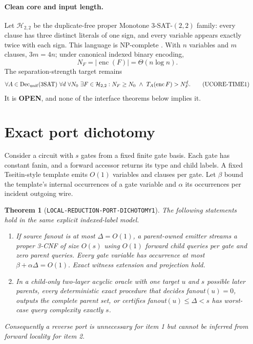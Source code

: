 \documentclass[11pt]{article}
\newtheorem{theorem}{Theorem}
\newcommand{\OPEN}{\textbf{OPEN}}
\begin{document}
\paragraph{Clean core and input length.}
Let $\mathcal H_{2,2}$ be the duplicate-free proper Monotone
3-SAT-$(2,2)$ family: every clause has three distinct literals of one sign,
and every variable appears exactly twice with each sign.  This language is
NP-complete \cite{doecker}.  With $n$ variables and $m$ clauses, $3m=4n$;
under canonical indexed binary encoding,
\[
 N_F=|\operatorname{enc}(F)|=\Theta(n\log n).
\]
The separation-strength target remains
\[
 \forall A\in\operatorname{Dec}_{\rm unif}(3\mathrm{SAT})\ 
 \forall d\ \forall N_0\ \exists F\in\mathcal H_{2,2}:
 N_F\ge N_0\ \land\ T_A(\operatorname{enc}F)>N_F^d.
\tag{UCORE-TIME1}
\]
It is \OPEN, and none of the interface theorems below implies it.

\section{Exact port dichotomy}

Consider a circuit with $s$ gates from a fixed finite gate basis.  Each gate
has constant fanin, and a forward accessor returns its type and child labels.
A fixed Tseitin-style template emits $O(1)$ variables and clauses per gate.
Let $\beta$ bound the template's internal occurrences of a gate variable and
$\alpha$ its occurrences per incident outgoing wire.

\begin{theorem}[\texttt{LOCAL-REDUCTION-PORT-DICHOTOMY1}]
The following statements hold in the same explicit indexed-label model.
\begin{enumerate}
\item If source fanout is at most $\Delta=O(1)$, a parent-owned emitter
streams a proper 3-CNF of size $O(s)$ using $O(1)$ forward child queries per
gate and zero parent queries.  Every gate variable has occurrence at most
$\beta+\alpha\Delta=O(1)$.  Exact witness extension and projection hold.
\item In a child-only two-layer acyclic oracle with one target $u$ and $s$
possible later parents, every deterministic exact procedure that decides
fanout$(u)=0$, outputs the complete parent set, or certifies
fanout$(u)\le\Delta<s$ has worst-case query complexity exactly $s$.
\end{enumerate}
Consequently a reverse port is unnecessary for item 1 but cannot be inferred
from forward locality for item 2.
\end{theorem}
\end{document}
